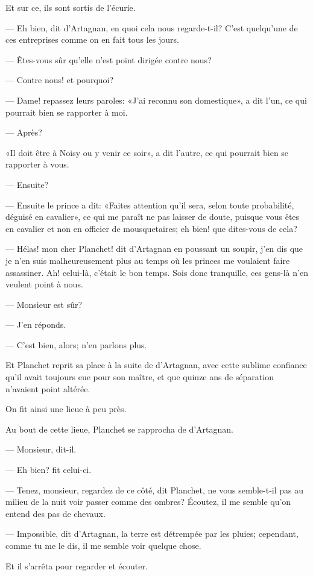 Et sur ce, ils sont sortis de l'écurie.

— Eh bien, dit d'Artagnan, en quoi cela nous regarde-t-il? C'est quelqu'une de ces entreprises comme on en fait tous les jours.

— Êtes-vous sûr qu'elle n'est point dirigée contre nous?

— Contre nous! et pourquoi?

— Dame! repassez leurs paroles: «J'ai reconnu son domestique», a dit l'un, ce qui pourrait bien se rapporter à moi.

— Après?

«Il doit être à Noisy ou y venir ce soir», a dit l'autre, ce qui pourrait bien se rapporter à vous.

— Ensuite?

— Ensuite le prince a dit: «Faites attention qu'il sera, selon toute probabilité, déguisé en cavalier», ce qui me paraît ne pas laisser de doute, puisque vous êtes en cavalier et non en officier de mousquetaires; eh bien! que dites-vous de cela?

— Hélas! mon cher Planchet! dit d'Artagnan en poussant un soupir, j'en dis que je n'en suis malheureusement plus au temps où les princes me voulaient faire assassiner. Ah! celui-là, c'était le bon temps. Sois donc tranquille, ces gens-là n'en veulent point à nous.

— Monsieur est sûr?

— J'en réponds.

— C'est bien, alors; n'en parlons plus.

Et Planchet reprit sa place à la suite de d'Artagnan, avec cette sublime confiance qu'il avait toujours eue pour son maître, et que quinze ans de séparation n'avaient point altérée.

On fit ainsi une lieue à peu près.

Au bout de cette lieue, Planchet se rapprocha de d'Artagnan.

— Monsieur, dit-il.

— Eh bien? fit celui-ci.

— Tenez, monsieur, regardez de ce côté, dit Planchet, ne vous semble-t-il pas au milieu de la nuit voir passer comme des ombres? Écoutez, il me semble qu'on entend des pas de chevaux.

— Impossible, dit d'Artagnan, la terre est détrempée par les pluies; cependant, comme tu me le dis, il me semble voir quelque chose.

Et il s'arrêta pour regarder et écouter.

